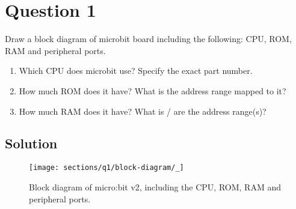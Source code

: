 \section*{Question 1}

Draw a block diagram of microbit board including the following: CPU, ROM, RAM and peripheral ports.

\begin{enumerate}[label = (\alph*)]
    \item Which CPU does microbit use? Specify the exact part number.
    \item How much ROM does it have? What is the address range mapped to it?
    \item How much RAM does it have? What is / are the address range(s)?
\end{enumerate}

\subsection*{Solution}

\begin{figure*}[htbp]
    \centering
    \texttt{[image: sections/q1/block-diagram/\_]}
    \caption[Block diagram of micro:bit v2]{
        Block diagram of micro:bit v2, including the CPU, ROM, RAM and peripheral ports.
    }\label{fig:block-diagram-microbit}
\end{figure*}
